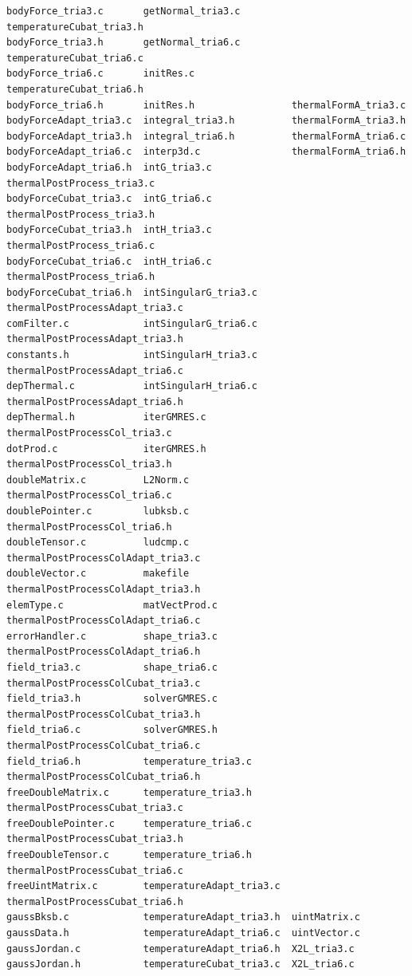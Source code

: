 \documentclass[12pt]{article}
\begin{document}
\small\begin{verbatim}
bodyForce_tria3.c       getNormal_tria3.c         temperatureCubat_tria3.h
bodyForce_tria3.h       getNormal_tria6.c         temperatureCubat_tria6.c
bodyForce_tria6.c       initRes.c                 temperatureCubat_tria6.h
bodyForce_tria6.h       initRes.h                 thermalFormA_tria3.c
bodyForceAdapt_tria3.c  integral_tria3.h          thermalFormA_tria3.h
bodyForceAdapt_tria3.h  integral_tria6.h          thermalFormA_tria6.c
bodyForceAdapt_tria6.c  interp3d.c                thermalFormA_tria6.h
bodyForceAdapt_tria6.h  intG_tria3.c              thermalPostProcess_tria3.c
bodyForceCubat_tria3.c  intG_tria6.c              thermalPostProcess_tria3.h
bodyForceCubat_tria3.h  intH_tria3.c              thermalPostProcess_tria6.c
bodyForceCubat_tria6.c  intH_tria6.c              thermalPostProcess_tria6.h
bodyForceCubat_tria6.h  intSingularG_tria3.c      thermalPostProcessAdapt_tria3.c
comFilter.c             intSingularG_tria6.c      thermalPostProcessAdapt_tria3.h
constants.h             intSingularH_tria3.c      thermalPostProcessAdapt_tria6.c
depThermal.c            intSingularH_tria6.c      thermalPostProcessAdapt_tria6.h
depThermal.h            iterGMRES.c               thermalPostProcessCol_tria3.c
dotProd.c               iterGMRES.h               thermalPostProcessCol_tria3.h
doubleMatrix.c          L2Norm.c                  thermalPostProcessCol_tria6.c
doublePointer.c         lubksb.c                  thermalPostProcessCol_tria6.h
doubleTensor.c          ludcmp.c                  thermalPostProcessColAdapt_tria3.c
doubleVector.c          makefile                  thermalPostProcessColAdapt_tria3.h
elemType.c              matVectProd.c             thermalPostProcessColAdapt_tria6.c
errorHandler.c          shape_tria3.c             thermalPostProcessColAdapt_tria6.h
field_tria3.c           shape_tria6.c             thermalPostProcessColCubat_tria3.c
field_tria3.h           solverGMRES.c             thermalPostProcessColCubat_tria3.h
field_tria6.c           solverGMRES.h             thermalPostProcessColCubat_tria6.c
field_tria6.h           temperature_tria3.c       thermalPostProcessColCubat_tria6.h
freeDoubleMatrix.c      temperature_tria3.h       thermalPostProcessCubat_tria3.c
freeDoublePointer.c     temperature_tria6.c       thermalPostProcessCubat_tria3.h
freeDoubleTensor.c      temperature_tria6.h       thermalPostProcessCubat_tria6.c
freeUintMatrix.c        temperatureAdapt_tria3.c  thermalPostProcessCubat_tria6.h
gaussBksb.c             temperatureAdapt_tria3.h  uintMatrix.c
gaussData.h             temperatureAdapt_tria6.c  uintVector.c
gaussJordan.c           temperatureAdapt_tria6.h  X2L_tria3.c
gaussJordan.h           temperatureCubat_tria3.c  X2L_tria6.c
\end{verbatim}\normalsize
\end{document}
